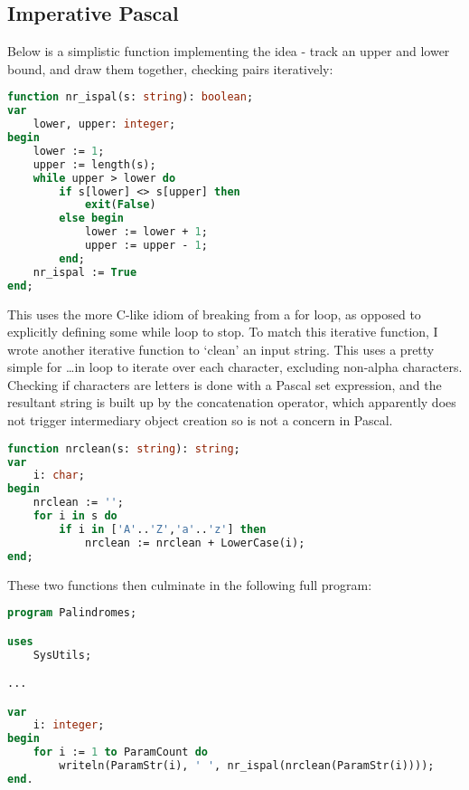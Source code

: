 \documentclass{article}
\begin{document}
    \subsection{Imperative Pascal}

    Below is a simplistic function implementing the idea - track an upper and
    lower bound, and draw them together, checking pairs iteratively:

\begin{lstlisting}[language=Pascal, caption=Nonrecursive palindrome function in Pascal]
function nr_ispal(s: string): boolean;
var
    lower, upper: integer;
begin
    lower := 1;
    upper := length(s);
    while upper > lower do
        if s[lower] <> s[upper] then
            exit(False)
        else begin
            lower := lower + 1;
            upper := upper - 1;
        end;
    nr_ispal := True
end;
\end{lstlisting}

    This uses the more C-like idiom of breaking from a for loop, as opposed to
    explicitly defining some while loop to stop. To match this iterative
    function, I wrote another iterative function to `clean' an input string.
    This uses a pretty simple for \ldots in loop to iterate over each
    character, excluding non-alpha characters. Checking if characters are
    letters is done with a Pascal set expression, and the resultant string is
    built up by the concatenation operator, which apparently does not trigger
    intermediary object creation so is not a concern in Pascal.

\begin{lstlisting}[language=Pascal, caption=Nonrecursive `clean' function in Pascal]
function nrclean(s: string): string;
var
    i: char;
begin
    nrclean := '';
    for i in s do
        if i in ['A'..'Z','a'..'z'] then
            nrclean := nrclean + LowerCase(i);
end;
\end{lstlisting}

    These two functions then culminate in the following full program:

\begin{lstlisting}[language=Pascal, caption=Remainder of nonrecursive Pascal program]
program Palindromes;

uses
    SysUtils;

...

var
    i: integer;
begin
    for i := 1 to ParamCount do
        writeln(ParamStr(i), ' ', nr_ispal(nrclean(ParamStr(i))));
end.
\end{lstlisting}
\end{document}
